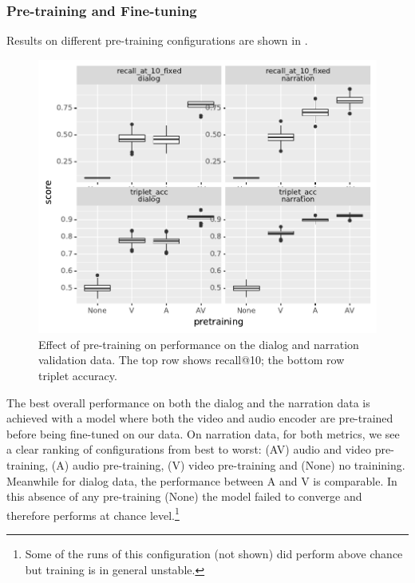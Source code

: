 \subsubsection{Pre-training and Fine-tuning}
Results on different pre-training configurations are shown in
.
\begin{figure}[htb]
	\centering
	\includegraphics[width=\columnwidth]{results/ablations/pretraining.pdf}
	\caption{Effect of pre-training on performance on the dialog
          and narration validation data. The top row shows recall@10;
          the bottom row triplet accuracy.}
	\label{fig:pretraining}
      \end{figure}

The best overall performance on both the dialog and the narration data is 
achieved with a model where both the video and audio encoder are pre-trained 
before being fine-tuned on our data. On narration data, for both metrics,
we see a clear ranking of
configurations from best to worst: (AV) audio and video pre-training,
(A) audio pre-training, (V) video pre-training and (None) no
trainining. Meanwhile for dialog data, the performance between A and V
is comparable. In this absence of any pre-training (None) the model failed
to converge and therefore performs at chance level.\footnote{Some of
  the runs of this configuration (not shown) did perform above chance but
  training is in general unstable.}


